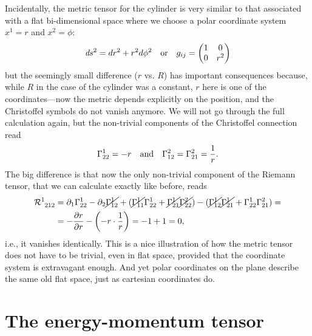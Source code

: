 Incidentally, the metric tensor for the cylinder is very similar to that associated
with a flat bi-dimensional space where we choose a polar coordinate system
$x^1 = r$ and $x^2 = \phi$:
\begin{align*}
  \emph{d}s^2 = dr^2 + r^2 d\phi^2 \quad\text{or}\quad
  g_{ij} =
  \begin{pmatrix}
    1 & 0\\
    0 & r^2\\
  \end{pmatrix}
\end{align*}
but the seemingly small difference ($r$ vs. $R$) has important consequences because,
while $R$ in the case of the cylinder was a constant, $r$ here is one of the
coordinates---now the metric depends explicitly on the position, and the Christoffel
symbols do not vanish anymore. We will not go through the full calculation again,
but the non-trivial components of the Christoffel connection read
\begin{align*}
  \Gamma^{1}_{22} = -r \quad\text{and}\quad
  \Gamma^{2}_{12} = \Gamma^{2}_{21} = \frac{1}{r}.
\end{align*}
The big difference is that now the only non-trivial component of the Riemann tensor,
that we can calculate exactly like before, reads
\begin{align*}
  \riemann{1}{212} & =
  \derx{1}\christoffel{1}{22} - \derx{2} \cancel{\christoffel{1}{12}} +
  (\cancel{\christoffel{1}{11}}\christoffel{1}{22} +
    \cancel{\christoffel{1}{21}}\cancel{\christoffel{2}{22}}) -
  (\cancel{\christoffel{1}{12}}\cancel{\christoffel{1}{21}} +
    \christoffel{1}{22}\christoffel{2}{21}) =\\
  & = -\pdv{r}{r} - \left( -r \cdot \frac{1}{r} \right) = -1 + 1 = 0,
\end{align*}
i.e., it vanishes identically. This is a nice illustration of how the metric tensor
does not have to be trivial, even in flat space, provided that the coordinate system
is extravagant enough. And yet polar coordinates on the plane describe the same
old flat space, just as cartesian coordinates do.



\section{The energy-momentum tensor}

